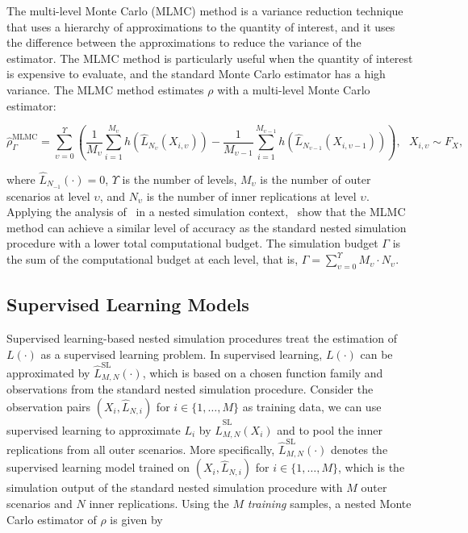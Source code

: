 The multi-level Monte Carlo (MLMC) method is a variance reduction technique that uses a hierarchy of approximations to the quantity of interest, and it uses the difference between the approximations to reduce the variance of the estimator.
The MLMC method is particularly useful when the quantity of interest is expensive to evaluate, and the standard Monte Carlo estimator has a high variance.
The MLMC method estimates $\rho$ with a multi-level Monte Carlo estimator:

\begin{equation*}
    \hat{\rho}^{\text{MLMC}}_\Gamma = \sum_{\upsilon=0}^{\Upsilon} \left( \frac{1}{M_{\upsilon}} \sum_{i=1}^{M_{\upsilon}} h(\hat{L}_{N_{\upsilon}}(X_{i, \upsilon})) - \frac{1}{M_{\upsilon-1}} \sum_{i=1}^{M_{\upsilon-1}} h(\hat{L}_{N_{\upsilon-1}}(X_{i, \upsilon-1})) \right), ~~~ X_{i, \upsilon} \sim F_X,
\end{equation*}

where $\hat{L}_{N_{-1}}(\cdot) = 0$, $\Upsilon$ is the number of levels, $M_{\upsilon}$ is the number of outer scenarios at level $\upsilon$, and $N_{\upsilon}$ is the number of inner replications at level $\upsilon$.
Applying the analysis of~\cite{giles2015multilevel} in a nested simulation context,~\cite{giles2019multilevel} show that the MLMC method can achieve a similar level of accuracy as the standard nested simulation procedure with a lower total computational budget.
The simulation budget $\Gamma$ is the sum of the computational budget at each level, that is, $\Gamma = \sum_{\upsilon=0}^{\Upsilon} M_{\upsilon} \cdot N_{\upsilon}$.

\subsection{Supervised Learning Models}

Supervised learning-based nested simulation procedures treat the estimation of $L(\cdot)$ as a supervised learning problem. 
In supervised learning, $L(\cdot)$ can be approximated by $\hat{L}^{\text{SL}}_{M, N}(\cdot)$, which is based on a chosen function family and observations from the standard nested simulation procedure.
Consider the observation pairs $(X_i, \hat{L}_{N, i})$ for $i \in \{1, \dots, M\}$ as training data, we can use supervised learning to approximate $L_i$ by $\hat{L}_{M, N}^{\text{SL}}(X_i)$ and to pool the inner replications from all outer scenarios.
More specifically, $\hat{L}^{\text{SL}}_{M, N}(\cdot)$ denotes the supervised learning model trained on $(X_i, \hat{L}_{N, i})$ for $i \in \{1, \dots, M\}$, which is the simulation output of the standard nested simulation procedure with $M$ outer scenarios and $N$ inner replications. 
Using the $M$ \textit{training} samples, a nested Monte Carlo estimator of $\rho$ is given by

